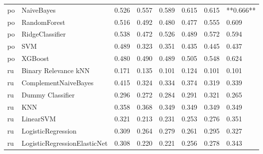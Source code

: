 \begin{tabular}{llllllll}
      po &                      NaiveBayes & 0.526 &                     0.557 &                 0.589 &                  0.615 &                                   0.615 & **0.666** \\
      po &                    RandomForest & 0.516 &                     0.492 &                 0.480 &                  0.477 &                                   0.555 &     0.609 \\
      po &                 RidgeClassifier & 0.538 &                     0.472 &                 0.526 &                  0.489 &                                   0.572 &     0.594 \\
      po &                             SVM & 0.489 &                     0.323 &                 0.351 &                  0.435 &                                   0.445 &     0.437 \\
      po &                         XGBoost & 0.480 &                     0.490 &                 0.489 &                  0.505 &                                   0.548 &     0.624 \\
      ru &            Binary Relevance kNN & 0.171 &                     0.135 &                 0.101 &                  0.124 &                                   0.101 &     0.101 \\
      ru &            ComplementNaiveBayes & 0.415 &                     0.324 &                 0.334 &                  0.374 &                                   0.319 &     0.339 \\
      ru &                Dummy Classifier & 0.296 &                     0.272 &                 0.284 &                  0.291 &                                   0.321 &     0.265 \\
      ru &                             KNN & 0.358 &                     0.368 &                 0.349 &                  0.349 &                                   0.349 &     0.349 \\
      ru &                       LinearSVM & 0.321 &                     0.213 &                 0.231 &                  0.253 &                                   0.276 &     0.351 \\
      ru &              LogisticRegression & 0.309 &                     0.264 &                 0.279 &                  0.261 &                                   0.295 &     0.327 \\
      ru &    LogisticRegressionElasticNet & 0.308 &                     0.220 &                 0.221 &                  0.256 &                                   0.278 &     0.343 \\

\end{tabular}
